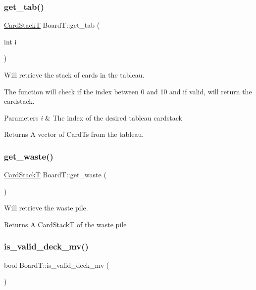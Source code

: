 \subsubsection{\texorpdfstring{get\+\_\+tab()}{get\_tab()}}
{\footnotesize\ttfamily \hyperlink{class_stack}{Card\+StackT} Board\+T\+::get\+\_\+tab (\begin{DoxyParamCaption}\item[{int}]{i }\end{DoxyParamCaption})}



Will retrieve the stack of cards in the tableau. 

The function will check if the index between 0 and 10 and if valid, will return the cardstack. 
\begin{DoxyParams}{Parameters}
{\em i} & The index of the desired tableau cardstack \\
\hline
\end{DoxyParams}
\begin{DoxyReturn}{Returns}
A vector of Card\+Ts from the tableau. 
\end{DoxyReturn}
\mbox{\label{class_board_t_a1e3a7edd2e993d22a453da1487177585}} 
\subsubsection{\texorpdfstring{get\+\_\+waste()}{get\_waste()}}
{\footnotesize\ttfamily \hyperlink{class_stack}{Card\+StackT} Board\+T\+::get\+\_\+waste (\begin{DoxyParamCaption}{ }\end{DoxyParamCaption})}



Will retrieve the waste pile. 

\begin{DoxyReturn}{Returns}
A Card\+StackT of the waste pile 
\end{DoxyReturn}
\mbox{\label{class_board_t_affe6cfc5c246bcfa0afd59476c70db8c}} 
\subsubsection{\texorpdfstring{is\+\_\+valid\+\_\+deck\+\_\+mv()}{is\_valid\_deck\_mv()}}
{\footnotesize\ttfamily bool Board\+T\+::is\+\_\+valid\+\_\+deck\+\_\+mv (\begin{DoxyParamCaption}{ }\end{DoxyParamCaption})}



